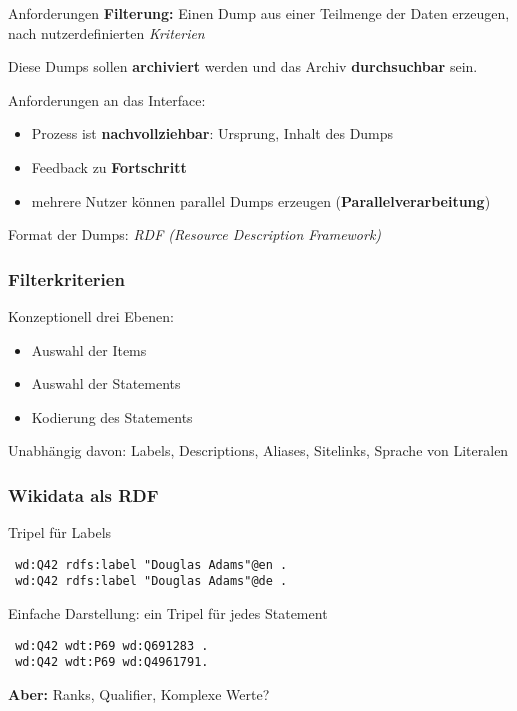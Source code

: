 \documentclass[aspectratio=169,xcolor=usenames,dvipsnames,svgnames]{beamer}
\begin{document}
\begin{frame}{Anforderungen}
  \alert{\textbf{Filterung:}} Einen Dump aus einer Teilmenge der Daten erzeugen, nach
  nutzerdefinierten \emph{Kriterien}

  Diese Dumps sollen \textbf{archiviert} werden und das Archiv \textbf{durchsuchbar} sein.

  \pause

  Anforderungen an das Interface:
  \begin{itemize}
      \item Prozess ist \textbf{nachvollziehbar}: Ursprung, Inhalt des Dumps
      \item Feedback zu \textbf{Fortschritt}
      \item mehrere Nutzer können parallel Dumps erzeugen (\textbf{Parallelverarbeitung})
  \end{itemize}

  \pause

  Format der Dumps: \emph{RDF (Resource Description Framework)}
\end{frame}


\begin{frame}[label=current]\frametitle{Filterkriterien}
  Konzeptionell drei Ebenen:
  \begin{itemize}
    \item Auswahl der Items
    \item Auswahl der Statements
    \item Kodierung des Statements
  \end{itemize}

  Unabhängig davon: Labels, Descriptions, Aliases, Sitelinks, Sprache von Literalen
\end{frame}


\begin{frame}[t, fragile]\frametitle{Wikidata als RDF}
  \begin{block}{Tripel für Labels}
  \begin{verbatim}
 wd:Q42 rdfs:label "Douglas Adams"@en .
 wd:Q42 rdfs:label "Douglas Adams"@de .
  \end{verbatim}
    \vspace{-0.2cm}
  \end{block}

  \begin{block}{Einfache Darstellung: ein Tripel für jedes Statement}
  \begin{verbatim}
 wd:Q42 wdt:P69 wd:Q691283 .
 wd:Q42 wdt:P69 wd:Q4961791.
  \end{verbatim}
    \vspace{-0.2cm}
  \end{block}

  \textbf{Aber:} Ranks, Qualifier, Komplexe Werte?
\end{frame}
\end{document}
